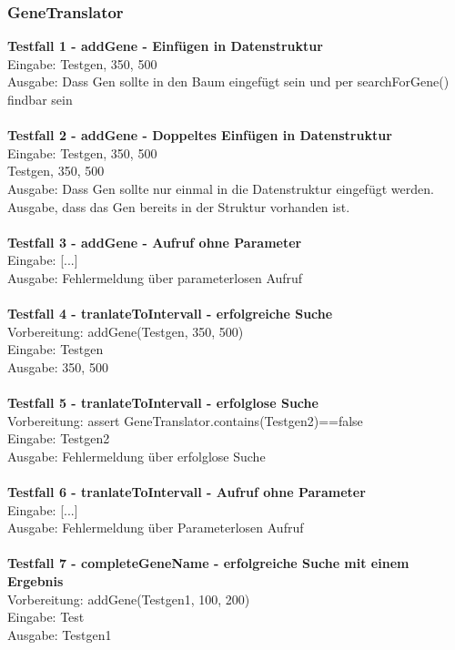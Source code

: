 \subsubsection{GeneTranslator}
\textbf{Testfall 1 - addGene - Einfügen in Datenstruktur}\\
Eingabe: Testgen, 350, 500\\
Ausgabe: Dass Gen sollte in den Baum eingefügt sein und per searchForGene() findbar sein\\
\\
\textbf{Testfall 2 - addGene - Doppeltes Einfügen in Datenstruktur}\\
Eingabe: Testgen, 350, 500\\
		 Testgen, 350, 500\\
Ausgabe: Dass Gen sollte nur einmal in die Datenstruktur eingefügt werden. Ausgabe, dass das Gen bereits in der Struktur vorhanden ist.\\
\\
\textbf{Testfall 3 - addGene - Aufruf ohne Parameter}\\
Eingabe: [...]\\
Ausgabe: Fehlermeldung über  parameterlosen Aufruf\\
\\
\textbf{Testfall 4 - tranlateToIntervall - erfolgreiche Suche}\\
Vorbereitung: addGene(Testgen, 350, 500)\\
Eingabe: Testgen \\
Ausgabe: 350, 500\\
\\
\textbf{Testfall 5 - tranlateToIntervall - erfolglose Suche}\\
Vorbereitung: assert GeneTranslator.contains(Testgen2)==false\\
Eingabe: Testgen2 \\
Ausgabe: Fehlermeldung über erfolglose Suche\\
\\
\textbf{Testfall 6 - tranlateToIntervall - Aufruf ohne Parameter}\\
Eingabe: [...]\\
Ausgabe: Fehlermeldung über Parameterlosen Aufruf\\
\\
\textbf{Testfall 7 - completeGeneName - erfolgreiche Suche mit einem Ergebnis}\\
Vorbereitung: addGene(Testgen1, 100, 200)\\
Eingabe: Test\\
Ausgabe: Testgen1\\
